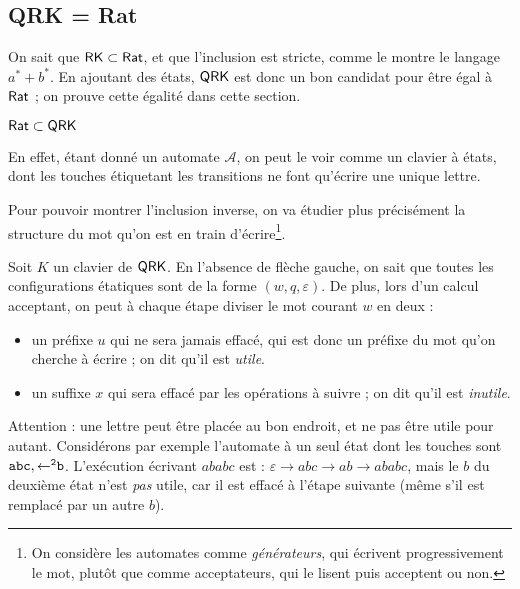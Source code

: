 \documentclass[12pt, a4paper]{article}
\newcommand{\A}{\mathcal{A}}
\begin{document}
    \subsection{QRK = Rat}
    On sait que \autocite[théorèmes~101/102]{bible} $\mathsf{RK} \subset \mathsf{Rat}$, et que l'inclusion est stricte, comme le montre le langage $a^* + b^*$. En ajoutant des états,
    $\mathsf{QRK}$ est donc un bon candidat pour être égal à $\mathsf{Rat}$ ; on prouve cette égalité dans cette section.
    
    \begin{RatdansQRK}
        $\mathsf{Rat} \subset \mathsf{QRK}$
    \end{RatdansQRK}
    En effet, étant donné un automate $\A$, on peut le voir comme un clavier à états, dont les touches étiquetant les transitions 
    ne font qu'écrire une unique lettre.
    


    Pour pouvoir montrer l'inclusion inverse, on va étudier plus précisément la structure du mot qu'on est en train d'écrire\footnote{On considère les automates comme \emph{générateurs}, qui écrivent progressivement le mot, plutôt que comme acceptateurs, qui le lisent puis acceptent ou non.}.
    
    Soit $K$ un clavier de $\mathsf{QRK}$. En l'absence de flèche gauche, on sait que toutes les configurations étatiques sont de la forme $(w,q,\varepsilon)$. De plus, lors d'un calcul acceptant, on peut à chaque étape diviser le mot courant $w$ en deux :
    \begin{itemize}
        \item un préfixe $u$ qui ne sera jamais effacé, qui est donc un préfixe du mot qu'on cherche à écrire ; on dit qu'il est \emph{utile}.
        \item un suffixe $x$ qui sera effacé par les opérations à suivre ; on dit qu'il est \emph{inutile}.
    \end{itemize}
    \begin{example}[Remarque]
        Attention : une lettre peut être placée au bon endroit, et ne pas être utile pour autant. Considérons par exemple l'automate à un seul état dont les touches sont $\mathtt{abc},\mathtt{\mathord{\leftarrow}^2b}$. 
    L'exécution écrivant $ababc$ est : $\varepsilon \rightarrow abc \rightarrow ab \rightarrow ababc$, mais le $b$ du deuxième état n'est \emph{pas} utile, car il est effacé à l'étape suivante (même s'il est remplacé par un autre $b$). \smallskip
    \end{example}
    
\end{document}
